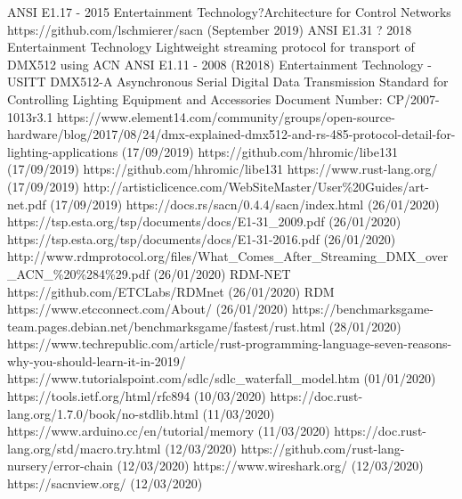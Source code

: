 \documentclass[11pt,a4paper]{article}
\begin{document}
\begin{thebibliography}{9}
	ANSI E1.17 - 2015 Entertainment Technology?Architecture for Control Networks
	https://github.com/lschmierer/sacn (September 2019)
	ANSI E1.31 ? 2018 Entertainment Technology Lightweight streaming protocol for transport of DMX512 using ACN
	ANSI E1.11 - 2008 (R2018) Entertainment Technology - USITT DMX512-A  Asynchronous Serial Digital Data Transmission 
	Standard for Controlling Lighting Equipment and Accessories Document Number: CP/2007-1013r3.1
	https://www.element14.com/community/groups/open-source-hardware/blog/2017/08/24/dmx-explained-dmx512-and-rs-485-protocol-detail-for-lighting-applications (17/09/2019)
	https://github.com/hhromic/libe131 (17/09/2019)
	https://github.com/hhromic/libe131
	https://www.rust-lang.org/ (17/09/2019)
	http://artisticlicence.com/WebSiteMaster/User\%20Guides/art-net.pdf (17/09/2019)
	https://docs.rs/sacn/0.4.4/sacn/index.html (26/01/2020)
	https://tsp.esta.org/tsp/documents/docs/E1-31\_2009.pdf
	(26/01/2020)
	https://tsp.esta.org/tsp/documents/docs/E1-31-2016.pdf
	(26/01/2020)
	http://www.rdmprotocol.org/files/What\_Comes\_After\_Streaming\_DMX\_over\_ACN\_\%20\%284\%29.pdf (26/01/2020)
	RDM-NET
	https://github.com/ETCLabs/RDMnet (26/01/2020)
	RDM
	https://www.etcconnect.com/About/ (26/01/2020)
	https://benchmarksgame-team.pages.debian.net/benchmarksgame/fastest/rust.html (28/01/2020)
	https://www.techrepublic.com/article/rust-programming-language-seven-reasons-why-you-should-learn-it-in-2019/
	https://www.tutorialspoint.com/sdlc/sdlc\_waterfall\_model.htm (01/01/2020)
	https://tools.ietf.org/html/rfc894 (10/03/2020)
	https://doc.rust-lang.org/1.7.0/book/no-stdlib.html (11/03/2020)
	https://www.arduino.cc/en/tutorial/memory (11/03/2020)
	https://doc.rust-lang.org/std/macro.try.html (12/03/2020)
	https://github.com/rust-lang-nursery/error-chain (12/03/2020)
	https://www.wireshark.org/ (12/03/2020)		
	https://sacnview.org/ (12/03/2020)

\end{thebibliography}
\end{document}
